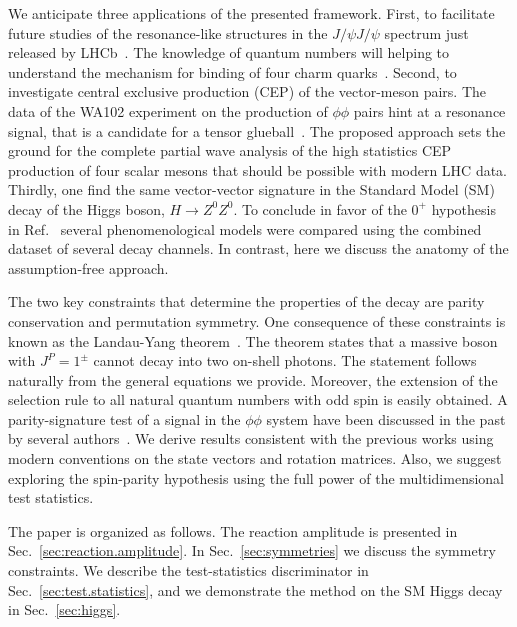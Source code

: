 \documentclass[prd,preprintnumbers,floatfix,
nofootinbib,superscriptaddress]{revtex4}
\begin{document}
We anticipate three applications of the presented framework.
First, to facilitate future studies of the resonance-like structures in the $J/\psi J/\psi$ spectrum
just released by LHCb~\cite{Aaij:2020xyz}.
The knowledge of quantum numbers will helping to understand the mechanism for binding of four charm quarks~\cite{Liu:2019zoy}.
Second, to investigate central exclusive production (CEP) of the vector-meson pairs.
The data of the WA102 experiment on the production of $\phi\phi$ pairs
hint at a resonance signal, that is a candidate for a tensor glueball~\cite{Barberis:2000em,Lebiedowicz:2019jru}.
The proposed approach sets the ground for the complete partial wave analysis of the high statistics CEP production of four scalar mesons that should be possible with modern LHC data.
Thirdly, one find the same vector-vector signature in the Standard Model (SM) decay of the Higgs boson, $H\to Z^0Z^0$.
To conclude in favor of the $0^+$ hypothesis in Ref.~\cite{Aad:2013xqa,CMS:2018mmw}
several phenomenological models were compared using the combined dataset of several decay channels.
In contrast, here we discuss the anatomy of the assumption-free approach.

The two key constraints that determine the properties of the decay are parity conservation and permutation symmetry.
One consequence of these constraints is known as the Landau-Yang theorem~\cite{Yang:1950rg,Landau:1948kw}.
The theorem states that a massive boson with $J^P = 1^\pm$ cannot decay into two on-shell photons.
The statement follows naturally from the general equations we provide. Moreover, the extension of the selection rule to all natural quantum numbers with odd spin is easily obtained.
A parity-signature test of a signal in the $\phi\phi$ system have been discussed in the past by several authors~\cite{Chang:1978jb,Collins:1977iv,Trueman:1978kh,Trueman:1978kh}.
We derive results consistent with the previous works using modern conventions on the state vectors and rotation matrices.
Also, we suggest exploring the spin-parity hypothesis using the full power of the multidimensional test statistics.

The paper is organized as follows. The reaction amplitude is presented in Sec.~\ref{sec:reaction.amplitude}.
In Sec.~\ref{sec:symmetries} we discuss the symmetry constraints.
We describe the test-statistics discriminator in Sec.~\ref{sec:test.statistics},
and we demonstrate the method on the SM Higgs decay in Sec.~\ref{sec:higgs}.
\end{document}
